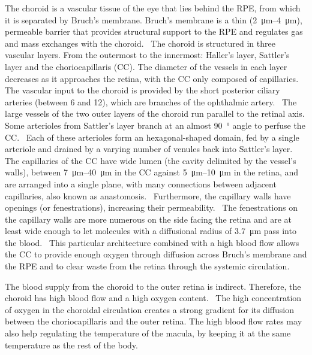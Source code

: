 \documentclass[12pt,a4paper]{journal}
\begin{document}
The choroid is a vascular tissue of the eye that lies behind the RPE, from which it is separated by Bruch's membrane.
Bruch's membrane is a thin (\SIrange{2}{4}{\micro\meter}), permeable barrier that provides structural support to the RPE and regulates gas and mass exchanges with the choroid.~\cite{Curcio_2013}
The choroid is structured in three vascular layers.
From the outermost to the innermost: Haller's layer, Sattler's layer and the choriocapillaris (CC).
The diameter of the vessels in each layer decreases as it approaches the retina, with the CC only composed of capillaries.
The vascular input to the choroid is provided by the short posterior ciliary arteries (between 6 and 12), which are branches of the ophthalmic artery.~\cite{Kiel_2010}
The large vessels of the two outer layers of the choroid run parallel to the retinal axis.
Some arterioles from Sattler's layer branch at an almost \SI{90}{\degree} angle to perfuse the CC.~\cite{Nickla_2010}
Each of these arterioles form an hexagonal-shaped domain, fed by a single arteriole and drained by a varying number of venules back into Sattler's layer.~\cite{Zouache_2016}
The capillaries of the CC have wide lumen (the cavity delimited by the vessel's walls), between \SIrange{7}{40}{\micro\meter} in the CC against \SIrange{5}{10}{\micro\meter} in the retina, and are arranged into a single plane, with many connections between adjacent capillaries, also known as anastomosis.~\cite{Bill_1983, ChanLing_2011,Fryczkowski_1994}
Furthermore, the capillary walls have openings (or fenestrations), increasing their permeability.~\cite{Nickla_2010}
The fenestrations on the capillary walls are more numerous on the side facing the retina and are at least wide enough to let molecules with a diffusional radius of \SI{3.7}{\micro\meter} pass into the blood.~\cite{Nickla_2010, Bill_1983}
This particular architecture combined with a high blood flow allows the CC to provide enough oxygen through diffusion across Bruch's membrane and the RPE and to clear waste from the retina through the systemic circulation.

The blood supply from the choroid to the outer retina is indirect.
Therefore, the choroid has high blood flow and a high oxygen content.~\cite{Bill_1983}
The high concentration of oxygen in the choroidal circulation creates a strong gradient for its diffusion between the choriocapillaris and the outer retina.
The high blood flow rates may also help regulating the temperature of the macula, by keeping it at the same temperature as the rest of the body.~\cite{Bill_1983, Parver_1991}
\end{document}

